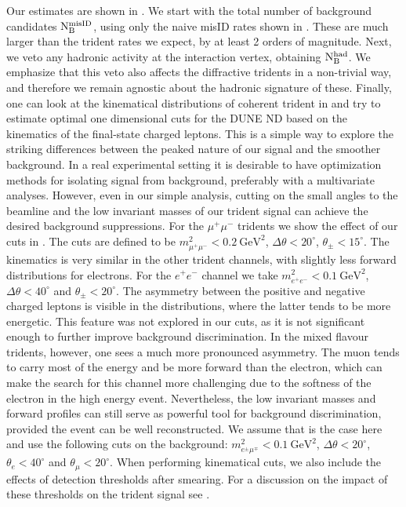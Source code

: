 Our estimates are shown in . We start with the total number of background candidates $\rm N_B^{\mathrm{misID}}$, using only the naive misID rates shown in . These are much larger than the trident rates we expect, by at least 2 orders of magnitude. Next, we veto any hadronic activity at the interaction vertex, obtaining $\rm N_B^{\mathrm{had}}$. We emphasize that this veto also affects the diffractive tridents in a non-trivial way, and therefore we remain agnostic about the hadronic signature of these. 
%
Finally, one can look at the kinematical distributions of coherent trident in  and try to estimate optimal one dimensional cuts for the DUNE ND based on the kinematics of the final-state charged leptons. This is a simple way to explore the striking differences between the peaked nature of our signal and the smoother background. In a real experimental setting it is desirable to have optimization methods for isolating signal from background, preferably with a multivariate analyses. However, even in our simple analysis, cutting on the small angles to the beamline and the low invariant masses of our trident signal can achieve the desired background suppressions. For the $\mu^+\mu^-$ tridents we show the effect of our cuts in . The cuts are defined to be $m^2_{\mu^+ \mu^-} < 0.2 \ \mathrm{GeV}^2$, $\Delta \theta < 20^\circ$, $\theta_\pm < 15^\circ$. The kinematics is very similar in the other trident channels, with slightly less forward distributions for electrons. For the $e^+ e^-$ channel we take  $m^2_{e^+ e^-} < 0.1 \ \mathrm{GeV}^2$, $\Delta \theta < 40^\circ$ and $\theta_\pm < 20^\circ$. 
%
The asymmetry between the positive and negative charged leptons is visible in the distributions, where the latter tends to be more energetic. This feature was not explored in our cuts, as it is not significant enough to further improve background discrimination. In the mixed flavour tridents, however, one sees a much more pronounced asymmetry. The muon tends to carry most of the energy and be more forward than the electron, which can make the search for this channel more challenging due to the softness of the electron in the high energy event. Nevertheless, the low invariant masses and forward profiles can still serve as powerful tool for background discrimination, provided the event can be well reconstructed. We assume that is the case here and use the following cuts on the background:  $m^2_{e^\pm \mu^\mp} < 0.1 \  \mathrm{GeV}^2$, $\Delta \theta < 20^\circ$, $\theta_e < 40^\circ$ and $\theta_\mu < 20^\circ$. When performing kinematical cuts, we also include the effects of detection thresholds after smearing. For a discussion on the impact of these thresholds on the trident signal see . 
%

